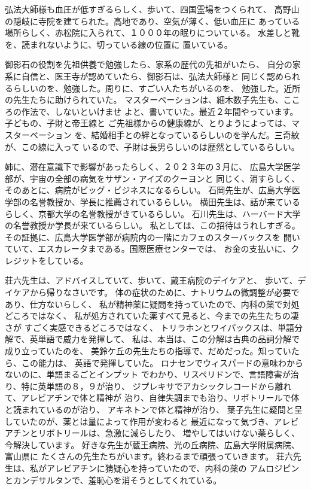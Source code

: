 \documentclass{jsarticle}
\begin{document}
        弘法大師様も血圧が低すぎるらしく、歩いて、四国霊場をつくられて、
    高野山の隠岐に寺院を建てられた。高地であり、空気が薄く、低い血圧に
    あっている場所らしく、赤松院に入られて、１０００年の眠りについている。
    水差しと靴を、読まれないように、切っている線の位置に
    置いている。




        御影石の役割を先祖供養で勉強したら、家系の歴代の先祖がいたら、
    自分の家系に自信と、医王寺が認めていたら、御影石は、弘法大師様と
    同じく認められるらしいのを、勉強した。周りに、すごい人たちがいるのを、
    勉強した。近所の先生たちに助けられていた。
    マスターベーションは、細木数子先生も、こころの作法で、しないといけませ
    よと、書いていた。最近２年間やっています。子どもの、子財と帝王線と
    ご先祖様からの健康線が、とりようによっては、マスターベーション
    を、結婚相手との絆となっているらしいのを学んだ。三奇紋が、この線に入って
    いるので、子財は長男らしいのは歴然としているらしい。



          姉に、潜在意識下で影響があったらしく、２０２３年の３月に、
    広島大学医学部が、宇宙の全部の病気をサザン・アイズのクーヨンと
    同じく、消すらしく、そのあとに、病院がビッグ・ビジネスになるらしい。
    石岡先生が、広島大学医学部の名誉教授か、学長に推薦されているらしい。
    横田先生は、話が来ているらしく、京都大学の名誉教授がきているらしい。
    石川先生は、ハーバード大学の名誉教授か学長が来ているらしい。
    私としては、この招待はうれしすぎる。　
    その証拠に、広島大学医学部が病院内の一階にカフェのスターバックスを
    開いていて、エスカレータまである。国際医療センターでは、
    お金の支払いに、クレジットをしている。

        荘六先生は、アドバイスしていて、歩いて、蔵王病院のデイケアと、
      歩いて、デイケアから帰りなさいです。
      体の症状のために、ナトリウムの微調整が必要であり、仕方ないらしく、
      私が精神薬に疑問を持っていたので、内科の薬で対処どころではなく、
      私が処方されていた薬すべて見ると、今までの先生たちの凄さが
      すごく実感できるどころではなく、
      トリラホンとワイパックスは、単語分解で、英単語で威力を発揮して、
      私は、本当は、この分解は古典の品詞分解で成り立っていたのを、
      美鈴ケ丘の先生たちの指導で、だめだった。知っていたら、この能力は、
      英語で発揮していた。
      ロナセンでウィスパードの意味わからないのに、単語まるごとインプット
      でわかり、リスペリドンで、言語障害が治り、特に英単語の８，９が治り、
      ジプレキサでアカシックレコードから離れて、アレビアチンで体と精神が
      治り、自律失調までも治り、リボトリールで体と読まれているのが治り、
      アキネトンで体と精神が治り、
      葉子先生に疑問と呈していたのが、薬とは量によって作用が変わると
      最近になって気づき、アレビアチンとリボトリールは、急激に減らしたり、
      増やしてはいけない薬らしく、今解決しています。
      好きな先生が蔵王病院、光の丘病院、広島大学附属病院、富山県に
      たくさんの先生たちがいます。終わるまで頑張っていきます。
        荘六先生は、私がアレビアチンに猜疑心を持っていたので、内科の薬の
      アムロジピンとカンデサルタンで、羞恥心を消そうとしてくれている。
\end{document}
